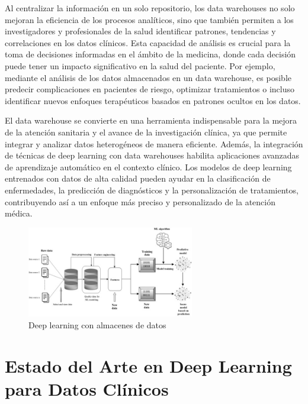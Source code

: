 \documentclass{article}
\begin{document}
Al centralizar la información en un solo repositorio, los data warehouses no solo mejoran la eficiencia de los procesos analíticos, sino que también permiten a los investigadores y profesionales de la salud identificar patrones, tendencias y correlaciones en los datos clínicos. Esta capacidad de análisis es crucial para la toma de decisiones informadas en el ámbito de la medicina, donde cada decisión puede tener un impacto significativo en la salud del paciente. Por ejemplo, mediante el análisis de los datos almacenados en un data warehouse, es posible predecir complicaciones en pacientes de riesgo, optimizar tratamientos o incluso identificar nuevos enfoques terapéuticos basados en patrones ocultos en los datos.

El data warehouse se convierte en una herramienta indispensable para la mejora de la atención sanitaria y el avance de la investigación clínica, ya que permite integrar y analizar datos heterogéneos de manera eficiente. Además, la integración de técnicas de deep learning con data warehouses habilita aplicaciones avanzadas de aprendizaje automático en el contexto clínico. Los modelos de deep learning entrenados con datos de alta calidad pueden ayudar en la clasificación de enfermedades, la predicción de diagnósticos y la personalización de tratamientos, contribuyendo así a un enfoque más preciso y personalizado de la atención médica. \cite{hamoud2018clinical}

\begin{figure}[H]
	\begin{center} 
		\includegraphics[width=0.65\textwidth]{images/dataWare.jpg} %
		\caption{Deep learning con almacenes de datos}
		\label{fig:Data_Warehouse}
	\end{center}
\end{figure}


\section{Estado del Arte en Deep Learning para Datos Clínicos}
\label{sec:estado_del_arte}
\end{document}
